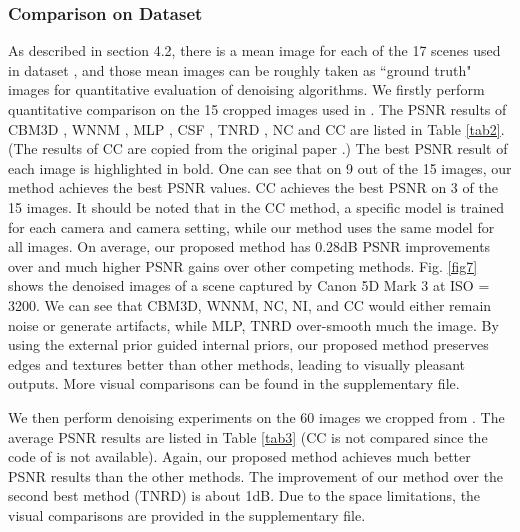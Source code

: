 \documentclass[10pt,twocolumn,letterpaper]{article}
\begin{document}
\subsubsection{Comparison on Dataset \cite{crosschannel2016}}

As described in section 4.2, there is a mean image for each of the 17 scenes used in dataset \cite{crosschannel2016}, and those mean images can be roughly taken as ``ground truth" images for quantitative evaluation of denoising algorithms. We firstly perform quantitative comparison on the 15 cropped images used in \cite{crosschannel2016}. The PSNR results of CBM3D \cite{bm3d}, WNNM \cite{wnnm}, MLP \cite{mlp}, CSF \cite{csf}, TNRD \cite{chen2015learning}, NC \cite{noiseclinic} and
CC \cite{crosschannel2016} are listed in Table \ref{tab2}. (The results of CC are copied from the original paper \cite{crosschannel2016}.) The best PSNR result of each image is highlighted in bold. One can see that on 9 out of the 15 images, our method achieves the best PSNR values. CC achieves the best PSNR on 3 of the 15 images. It should be noted that in the CC method, a specific model is trained for each camera and camera setting, while our method uses the same model for all images. On average, our proposed method has 0.28dB PSNR improvements over \cite{crosschannel2016} and much higher PSNR gains over other competing methods. Fig. \ref{fig7} shows the denoised images of a scene captured by Canon 5D Mark 3 at ISO = 3200. We can see that CBM3D, WNNM, NC, NI, and CC would either remain noise or generate artifacts, while MLP, TNRD over-smooth much the image. By using the external prior guided internal priors, our proposed method preserves edges and textures better than other methods, leading to visually pleasant outputs. More visual comparisons can be found in the supplementary file.

We then perform denoising experiments on the 60 images we cropped from \cite{crosschannel2016}. The average PSNR results are listed in Table \ref{tab3} (CC is not compared since the code of \cite{crosschannel2016} is not available). Again, our proposed method achieves much better PSNR results than the other methods. The improvement of our method over the second best method (TNRD) is about 1dB. Due to the space limitations, the visual comparisons are provided in the supplementary file.
\end{document}
